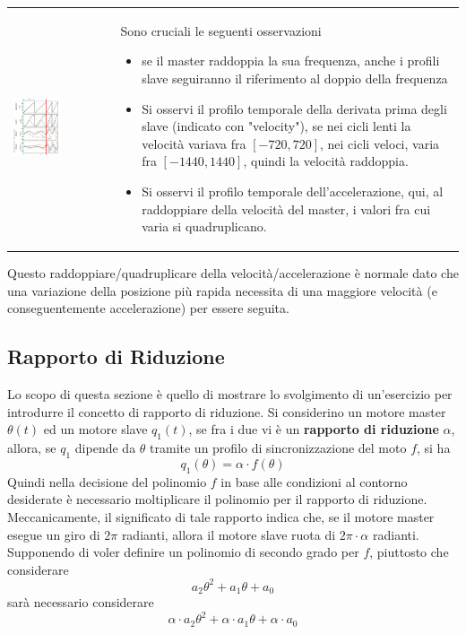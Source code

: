\documentclass[10pt, letterpaper]{report}
\begin{document}
\begin{center}
	\begin{tabular}{>{\centering\arraybackslash}m{3in}>{\arraybackslash}m{3in}}
        \includegraphics[width=0.5\textwidth]{images/cambioVel2.png} & 
        Sono cruciali le seguenti osservazioni\begin{itemize}
            \item se il master raddoppia la sua frequenza, anche i profili slave seguiranno il riferimento al doppio della frequenza 
            \item Si osservi il profilo temporale della derivata prima degli slave (indicato con "velocity"), se nei cicli lenti la velocità variava fra $[-720,720]$, nei cicli veloci, varia fra $[-1440,1440]$, quindi la velocità raddoppia.
            \item Si osservi il profilo temporale dell'accelerazione, qui, al raddoppiare della velocità del master, i valori fra cui varia si quadruplicano.
        \end{itemize}
		\\
	\end{tabular}
\end{center}
Questo raddoppiare/quadruplicare della velocità/accelerazione è normale dato che una variazione della posizione più rapida necessita di una maggiore velocità (e conseguentemente accelerazione) per essere seguita.
\subsection{Rapporto di Riduzione}
Lo scopo di questa sezione è quello di mostrare lo svolgimento di un'esercizio per introdurre il concetto di rapporto di riduzione.\acc 
Si considerino un motore master $\theta(t)$ ed un motore slave $q_1(t)$, se fra i due vi è un \textbf{rapporto di riduzione} $\alpha$, allora, se $q_1$ dipende da $\theta$ tramite un profilo di sincronizzazione del moto $f$, si ha 
$$ q_1(\theta)=\alpha\cdot f(\theta)$$
Quindi nella decisione del polinomio $f$ in base alle condizioni al contorno desiderate è necessario moltiplicare il polinomio per il rapporto di riduzione.\acc 
Meccanicamente, il significato di tale rapporto indica che, se il motore master esegue un giro di $2\pi$ radianti, allora il motore slave ruota di $2\pi\cdot \alpha $ radianti.\acc 
Supponendo di voler definire un polinomio di secondo grado per $f$, piuttosto che considerare 
$$ a_2\theta^2+a_1\theta+a_0$$
sarà necessario considerare
$$ \alpha\cdot a_2\theta^2+\alpha\cdot a_1\theta+\alpha\cdot a_0$$
\end{document}
